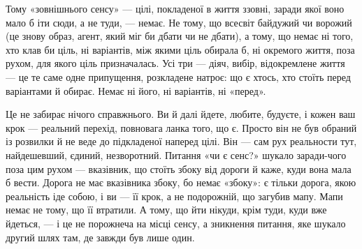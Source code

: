 \documentclass[12pt, a4paper, openany]{book}
\begin{document}
Тому «зовнішнього сенсу» --- цілі, покладеної в життя ззовні, заради якої воно мало б іти сюди, а не туди, --- немає. Не тому, що всесвіт байдужий чи ворожий (це знову образ, агент, який міг би дбати чи не дбати), а тому, що немає ні того, хто клав би ціль, ні варіантів, між якими ціль обирала б, ні окремого життя, поза рухом, для якого ціль призначалась. Усі три --- діяч, вибір, відокремлене життя --- це те саме одне припущення, розкладене натроє: що є хтось, хто стоїть перед варіантами й обирає. Немає ні його, ні варіантів, ні «перед».

Це не забирає нічого справжнього. Ви й далі йдете, любите, будуєте, і кожен ваш крок --- реальний перехід, повновага ланка того, що є. Просто він не був обраний із розвилки й не веде до підкладеної наперед цілі. Він --- сам рух реальности тут, найдешевший, єдиний, незворотний. Питання «чи є сенс?» шукало заради-чого поза цим рухом --- вказівник, що стоїть збоку від дороги й каже, куди вона мала б вести. Дорога не має вказівника збоку, бо немає «збоку»: є тільки дорога, якою реальність іде собою, і ви --- її крок, а не подорожній, що загубив мапу. Мапи немає не тому, що її втратили. А тому, що йти нікуди, крім туди, куди вже йдеться, --- і це не порожнеча на місці сенсу, а зникнення питання, яке шукало другий шлях там, де завжди був лише один.
\end{document}
